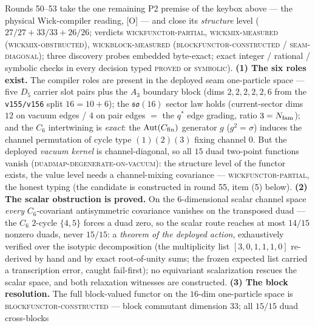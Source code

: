 \begin{keybox}
Rounds 50--53 take the one remaining P2 premise of the keybox
above --- the physical Wick-compiler reading, [O] --- and close
its \emph{structure} level ($27/27 + 33/33 + 26/26$; verdicts
\textsc{wickfunctor-partial}, \textsc{wickmix-measured
(wickmix-obstructed)}, \textsc{wickblock-measured
(blockfunctor-constructed / seam-diagonal)}; three discovery
probes embedded byte-exact; exact integer / rational /
symbolic checks in every decision typed \textsc{proved} or
\textsc{symbolic}).  \textbf{(1) The six roles exist.}  The
compiler roles are present in the deployed seam one-particle
space --- five $D_5$ carrier slot pairs plus the $A_3$
boundary block (dims $2,2,2,2,2,6$ from the \texttt{v155/v156}
split $16 = 10 + 6$); the $\mathfrak{so}(16)$ sector law holds
(current-sector dims $12$ on vacuum edges / $4$ on pair edges
$=$ the $q^{*}$ edge grading, ratio $3 = N_{\mathrm{fam}}$); and the
$C_6$ intertwining is \emph{exact}: the $\mathrm{Aut}(C_{\rm
fin})$ generator $g$ ($g^2 = \sigma$) induces the channel
permutation of cycle type $(1)(2)(3)$ fixing channel $0$.  But
the deployed \emph{vacuum kernel} is channel-diagonal, so all
$15$ duad two-point functions vanish
(\textsc{duadmap-degenerate-on-vacuum}): the structure level
of the functor exists, the value level needs a channel-mixing
covariance --- \textsc{wickfunctor-partial}, the honest
typing (the candidate is constructed in round 55, item (5)
below).  \textbf{(2) The scalar obstruction is proved.}  On
the $6$-dimensional scalar channel space \emph{every}
$C_6$-covariant antisymmetric covariance vanishes on the
transposed duad --- the $C_6$ $2$-cycle $\{4, 5\}$ forces a
duad zero, so the scalar route reaches at most $14/15$ nonzero
duads, never $15/15$: a \emph{theorem of the deployed action},
exhaustively verified over the isotypic decomposition (the
multiplicity list $[3,0,1,1,1,0]$ re-derived by hand and by
exact root-of-unity sums; the frozen expected list carried a
transcription error, caught fail-first); no equivariant
scalarization rescues the scalar space, and both relaxation
witnesses are constructed.  \textbf{(3) The block
resolution.}  The full block-valued functor on the $16$-dim
one-particle space is \textsc{blockfunctor-constructed} ---
block commutant dimension $33$; all $15/15$ duad cross-blocks

\end{keybox}
